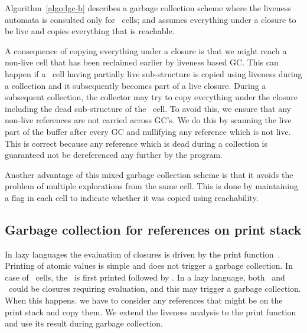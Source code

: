 \documentclass[9pt]{sigplanconf}
\begin{document}
  Algorithm~\ref{algo:lgc-b}  describes  a garbage  collection  scheme
  where the liveness automata is  consulted only for \CONS\ cells; and
  assumes everything under a closure  to be live and copies everything
  that is reachable.
 
A consequence of  copying everything under a closure is  that we might
reach  a non-live  cell that  has been  reclaimed earlier  by liveness
based GC.   This can  happen if  a \CONS\  cell having  partially live
sub-structure  is copied  using liveness  during a  collection and  it
subsequently  becomes part  of a  live closure.   During a  subsequent
collection, the collector may try to copy everything under the closure
including the dead  sub-structure of the \CONS\ cell.   To avoid this,
we ensure  that any non-live  references are not carried  across GC's.
We do this by scanning the live  part of the buffer after every GC and
nullifying any  reference which is  not live. This is  correct because
any reference which  is dead during a collection is  guaranteed not be
dereferenced any further by the program.

Another advantage of  this mixed garbage collection scheme  is that it
avoids the problem of multiple  explorations from the same cell.  This
is done by maintaining a flag in  each cell to indicate whether it was
copied using reachability.

\subsection{Garbage collection for references on print stack}
In lazy  languages the evaluation of  closures is driven  by the print
function~\cite{Jones87}.  Printing of  atomic values is
simple  and  does  not  trigger  a garbage  collection.   In  case  of
\CONS\ cells, the \CAR\ is first  printed followed by \CDR.  In a lazy
language, both \CAR\ and \CDR\ could be closures requiring evaluation,
and this  may trigger  a garbage collection.   When this  happens.  we
have to consider  any references that might be on  the print stack and
copy them. We extend the liveness analysis to the print function and
use its result during garbage collection.

\end{document}
